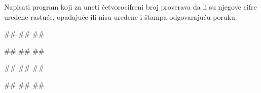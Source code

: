 \begin{Exercise}[label=v1.2_13] 
Napisati program koji za uneti četvorocifreni broj proverava
da li su njegove cifre uređene rastuće, opadajuće ili nisu
uređene i štampa odgovarajuću poruku.

\begin{miditest}
\begin{upotreba}{1}
#\naslovInt#
##
##
\end{upotreba}
\end{miditest}
\begin{miditest}
\begin{upotreba}{2}
#\naslovInt#
##
##\end{upotreba}
\end{miditest}

\begin{miditest}
\begin{upotreba}{3}
#\naslovInt#
##
##\end{upotreba}
\end{miditest}
\begin{miditest}
\begin{upotreba}{4}
#\naslovInt#
##
##\end{upotreba}
\end{miditest}

\end{Exercise}
\ifresenja
 \begin{Answer}[ref=v1.2_13]
\end{Answer}
\fi


